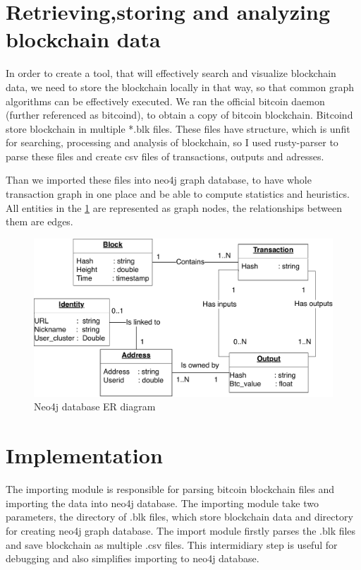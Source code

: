 \documentclass[
  digital, %
  table,   %
  lof,     %
  lot,     %
  oneside
]{fithesis3}
\begin{document}
\section{Retrieving,storing and analyzing blockchain data}
In order to create a tool, that will effectively search and visualize blockchain data,
we need to store the blockchain locally in that way, so that common graph algorithms can be effectively executed.
We ran the official bitcoin daemon (further referenced as bitcoind), to obtain a copy of bitcoin blockchain. Bitcoind store blockchain in multiple *.blk files.
These files have structure, which is unfit for searching, processing and analysis of blockchain, so I used rusty-parser to parse these files and create csv files of transactions, outputs and adresses.

Than we imported these files into neo4j graph database, to have whole transaction graph in one place and be able to compute statistics and heuristics.
All entities in the \ref{neo4jschema} are represented as graph nodes, the relationships between them are edges.
\begin{figure}[!htb]
    \centering
    \includegraphics[width=1\textwidth]{neo4j-schema}
    \caption{Neo4j database ER diagram}
    \label{neo4jschema}
\end{figure}

\section{Implementation}

The importing module is responsible for parsing bitcoin blockchain files and importing the data into neo4j database.
The importing module take two parameters, the directory of .blk files, which store blockchain data and directory for creating neo4j graph database.
The import module firstly parses the .blk files and save blockchain as multiple .csv files. This intermidiary step is useful for debugging and also simplifies importing to neo4j database.
\end{document}
